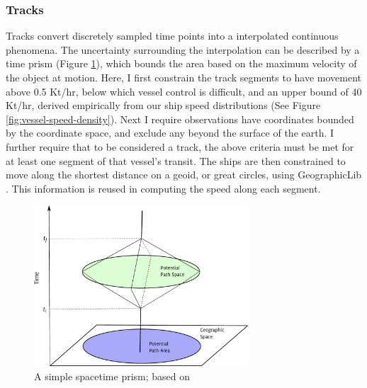 \subsubsection{Tracks}

Tracks convert discretely sampled time points into a interpolated continuous phenomena. The uncertainty surrounding the interpolation can be described by a time prism (Figure \ref{fig:time-prism}), which bounds the area based on the maximum velocity of the object at motion. Here, I first constrain the track segments to have movement above 0.5 Kt/hr, below which vessel control is difficult, and an upper bound of 40 Kt/hr, derived empirically from our ship speed distributions (See Figure \ref{fig:vessel-speed-density}). Next I require observations have coordinates bounded by the coordinate space, and exclude %
any beyond the surface of the earth. I further require that to be considered a track, the above criteria must be met for at least one segment of that vessel's transit. The ships are then constrained to move along the shortest distance on a geoid, or great circles, using GeographicLib \citep{karney2012algorithms}. This information is reused in computing the speed along each segment. %

\begin{figure}[h!]
  \centering
    \includegraphics[width=80mm]{figures/time-geography-prism.pdf}
  \caption[A simple space{\textendash}time prism]{A simple space{\textendash}time prism; based on \citep{Wu2002}}
  \label{fig:time-prism}
\end{figure}


